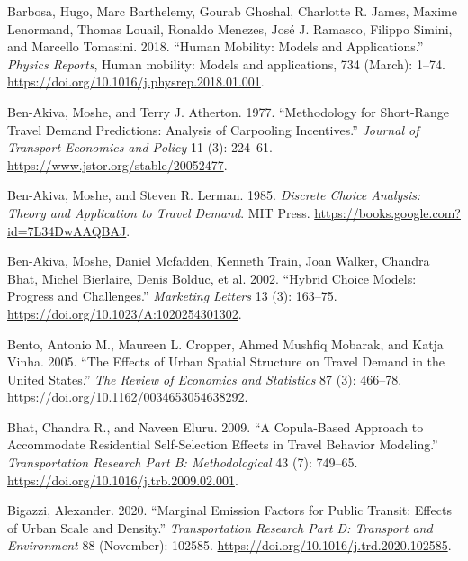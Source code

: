 \documentclass[
  12pt,
]{article}
\newlength{\cslhangindent}
\newlength{\cslentryspacingunit} %
\newenvironment{CSLReferences}[2] %
 {%
  \setlength{\parindent}{0pt}
  \ifodd #1
  \let\oldpar\par
  \def\par{\hangindent=\cslhangindent\oldpar}
  \fi
  \setlength{\parskip}{#2\cslentryspacingunit}
 }%
 {}
\begin{document}
\begin{CSLReferences}{1}{0}
\leavevmode{}%
Barbosa, Hugo, Marc Barthelemy, Gourab Ghoshal, Charlotte R. James, Maxime Lenormand, Thomas Louail, Ronaldo Menezes, José J. Ramasco, Filippo Simini, and Marcello Tomasini. 2018. {``Human Mobility: {Models} and Applications.''} \emph{Physics Reports}, Human mobility: {Models} and applications, 734 (March): 1--74. \url{https://doi.org/10.1016/j.physrep.2018.01.001}.

\leavevmode{}%
Ben-Akiva, Moshe, and Terry J. Atherton. 1977. {``Methodology for {Short-Range Travel Demand Predictions}: {Analysis} of {Carpooling Incentives}.''} \emph{Journal of Transport Economics and Policy} 11 (3): 224--61. \url{https://www.jstor.org/stable/20052477}.

\leavevmode{}%
Ben-Akiva, Moshe, and Steven R. Lerman. 1985. \emph{Discrete {Choice Analysis}: {Theory} and {Application} to {Travel Demand}}. {MIT Press}. \url{https://books.google.com?id=7L34DwAAQBAJ}.

\leavevmode{}%
Ben-Akiva, Moshe, Daniel Mcfadden, Kenneth Train, Joan Walker, Chandra Bhat, Michel Bierlaire, Denis Bolduc, et al. 2002. {``Hybrid {Choice Models}: {Progress} and {Challenges}.''} \emph{Marketing Letters} 13 (3): 163--75. \url{https://doi.org/10.1023/A:1020254301302}.

\leavevmode{}%
Bento, Antonio M., Maureen L. Cropper, Ahmed Mushfiq Mobarak, and Katja Vinha. 2005. {``The {Effects} of {Urban Spatial Structure} on {Travel Demand} in the {United States}.''} \emph{The Review of Economics and Statistics} 87 (3): 466--78. \url{https://doi.org/10.1162/0034653054638292}.

\leavevmode{}%
Bhat, Chandra R., and Naveen Eluru. 2009. {``A Copula-Based Approach to Accommodate Residential Self-Selection Effects in Travel Behavior Modeling.''} \emph{Transportation Research Part B: Methodological} 43 (7): 749--65. \url{https://doi.org/10.1016/j.trb.2009.02.001}.

\leavevmode{}%
Bigazzi, Alexander. 2020. {``Marginal Emission Factors for Public Transit: {Effects} of Urban Scale and Density.''} \emph{Transportation Research Part D: Transport and Environment} 88 (November): 102585. \url{https://doi.org/10.1016/j.trd.2020.102585}.


\end{CSLReferences}
\end{document}
